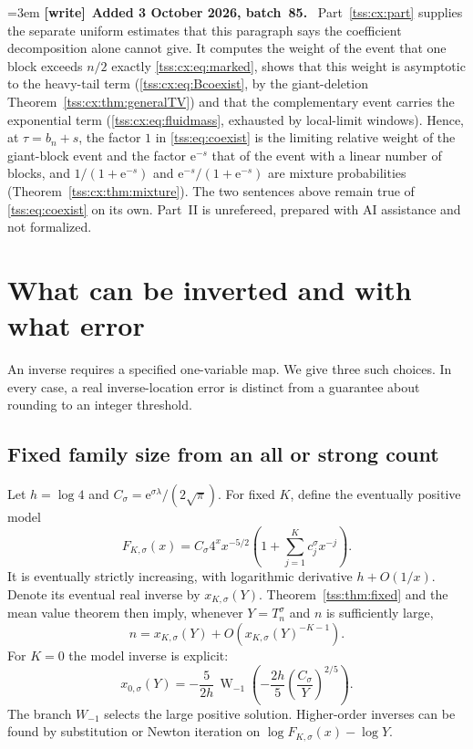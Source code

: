 \documentclass[11pt]{article}
\theoremstyle{remark}\newtheorem{remark}[theorem]{Remark}
\theoremstyle{definition}\newtheorem{definition}[theorem]{Definition}
\newcommand{\e}{\mathrm e}
\newenvironment{writenote}[1][]{\par\smallskip\begingroup\small\emergencystretch=3em
 \noindent\textbf{[write]}\if\relax\detokenize{#1}\relax\else~\textbf{#1.}\fi\ }%
 {\par\endgroup\smallskip}
\begin{document}
\begin{writenote}[Added 3 October 2026, batch~85]
Part~\ref{tss:cx:part} supplies the separate uniform estimates that this
paragraph says the coefficient decomposition alone cannot give. It computes
the weight of the event that one block exceeds $n/2$ exactly
\eqref{tss:cx:eq:marked}, shows that this weight is asymptotic to the
heavy-tail term (\eqref{tss:cx:eq:Bcoexist}, by the giant-deletion
Theorem~\ref{tss:cx:thm:generalTV}) and that the complementary event carries
the exponential term (\eqref{tss:cx:eq:fluidmass}, exhausted by local-limit
windows). Hence, at $\tau=b_n+s$, the factor $1$ in \eqref{tss:eq:coexist}
is the limiting relative weight of the giant-block event and the factor
$\e^{-s}$ that of the event with a linear number of blocks, and
$1/(1+\e^{-s})$ and $\e^{-s}/(1+\e^{-s})$ are mixture probabilities
(Theorem~\ref{tss:cx:thm:mixture}). The two sentences above remain true of
\eqref{tss:eq:coexist} on its own. Part~II is unrefereed, prepared with AI
assistance and not formalized.
\end{writenote}

\section{What can be inverted and with what error}
\label{tss:sec:inverse}
An inverse requires a specified one-variable map. We give three such choices. In every case, a real inverse-location error is distinct from a guarantee about rounding to an integer threshold.

\subsection{Fixed family size from an all or strong count}
Let $h=\log4$ and $C_\sigma=\e^{\sigma\lambda}/(2\sqrt\pi)$. For fixed $K$, define the eventually positive model
\begin{equation}\label{tss:eq:fixedmodel}
F_{K,\sigma}(x)=C_\sigma4^xx^{-5/2}
 \left(1+\sum_{j=1}^K c_j^\sigma x^{-j}\right).
\end{equation}
It is eventually strictly increasing, with logarithmic derivative $h+O(1/x)$. Denote its eventual real inverse by $x_{K,\sigma}(Y)$. Theorem~\ref{tss:thm:fixed} and the mean value theorem then imply, whenever $Y=T_n^\sigma$ and $n$ is sufficiently large,
\begin{equation}\label{tss:eq:fixedinverse}
n=x_{K,\sigma}(Y)+O(x_{K,\sigma}(Y)^{-K-1}).
\end{equation}
For $K=0$ the model inverse is explicit:
\begin{equation}\label{tss:eq:lambert}
x_{0,\sigma}(Y)=-\frac5{2h}\,\mathop{W}_{-1}
 \left(-\frac{2h}{5}\left(\frac{C_\sigma}{Y}\right)^{2/5}\right).
\end{equation}
The branch $W_{-1}$ selects the large positive solution. Higher-order inverses can be found by substitution or Newton iteration on $\log F_{K,\sigma}(x)-\log Y$.
\end{document}
